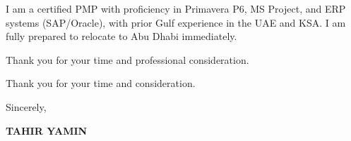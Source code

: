 \documentclass[11pt,a4paper]{article}
\begin{document}
I am a certified PMP with proficiency in Primavera P6, MS Project, and ERP systems (SAP/Oracle), with prior Gulf experience in the UAE and KSA. I am fully prepared to relocate to Abu Dhabi immediately.

Thank you for your time and professional consideration.

Thank you for your time and consideration.

\vspace{0.5cm}
Sincerely,

\vspace{0.5cm}
\textbf{TAHIR YAMIN}
\end{document}
